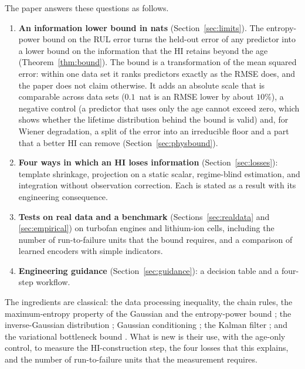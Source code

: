 \documentclass[preprint,12pt]{elsarticle}
\theoremstyle{definition}
\begin{document}
The paper answers these questions as follows.
\begin{enumerate}
\item \textbf{An information lower bound in nats} (Section~\ref{sec:limits}). The entropy-power bound on the RUL error turns the held-out error of any predictor into a lower bound on the information that the HI retains beyond the age (Theorem~\ref{thm:bound}). The bound is a transformation of the mean squared error: within one data set it ranks predictors exactly as the RMSE does, and the paper does not claim otherwise. It adds an absolute scale that is comparable across data sets ($0.1$~nat is an RMSE lower by about $10\%$), a negative control (a predictor that uses only the age cannot exceed zero, which shows whether the lifetime distribution behind the bound is valid) and, for Wiener degradation, a split of the error into an irreducible floor and a part that a better HI can remove (Section~\ref{sec:physbound}).
\item \textbf{Four ways in which an HI loses information} (Section~\ref{sec:losses}): template shrinkage, projection on a static scalar, regime-blind estimation, and integration without observation correction. Each is stated as a result with its engineering consequence.
\item \textbf{Tests on real data and a benchmark} (Sections~\ref{sec:realdata} and \ref{sec:empirical}) on turbofan engines and lithium-ion cells, including the number of run-to-failure units that the bound requires, and a comparison of learned encoders with simple indicators.
\item \textbf{Engineering guidance} (Section~\ref{sec:guidance}): a decision table and a four-step workflow.
\end{enumerate}
The ingredients are classical: the data processing inequality, the chain rules, the maximum-entropy property of the Gaussian and the entropy-power bound \cite{cover2006}; the inverse-Gaussian distribution \cite{chhikara1989}; Gaussian conditioning \cite{bishop2006}; the Kalman filter \cite{kalman1960,durbin2012}; and the variational bottleneck bound \cite{alemi2017}. What is new is their use, with the age-only control, to measure the HI-construction step, the four losses that this explains, and the number of run-to-failure units that the measurement requires.
\end{document}
